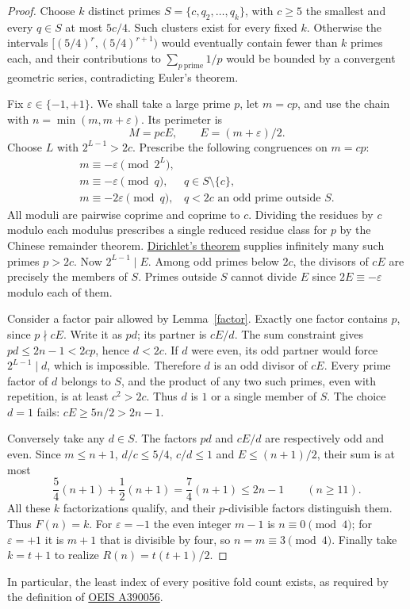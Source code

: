 \documentclass[11pt,letterpaper]{article}
\begin{document}
\begin{proof}
Choose $k$ distinct primes $S=\{c,q_2,\ldots,q_k\}$, with $c\ge5$ the smallest and every $q\in S$ at most $5c/4$. Such clusters exist for every fixed $k$. Otherwise the intervals $[(5/4)^r,(5/4)^{r+1})$ would eventually contain fewer than $k$ primes each, and their contributions to $\sum_{p\ \mathrm{prime}}1/p$ would be bounded by a convergent geometric series, contradicting Euler's theorem.

Fix $\varepsilon\in\{-1,+1\}$. We shall take a large prime $p$, let $m=cp$, and use the chain with $n=\min(m,m+\varepsilon)$. Its perimeter is
\[
 M=pcE,\qquad E=(m+\varepsilon)/2 .
\]
Choose $L$ with $2^{L-1}>2c$. Prescribe the following congruences on $m=cp$:
\[
\begin{array}{ll}
 m\equiv-\varepsilon\pmod{2^L},&\\
 m\equiv-\varepsilon\pmod q, & q\in S\setminus\{c\},\\
 m\equiv-2\varepsilon\pmod q,
   &q<2c\text{ an odd prime outside }S .
\end{array}
\]
All moduli are pairwise coprime and coprime to $c$. Dividing the residues by $c$ modulo each modulus prescribes a single reduced residue class for $p$ by the Chinese remainder theorem. \href{https://math.mit.edu/classes/18.785/2021fa/LectureNotes18.pdf}{Dirichlet's theorem} supplies infinitely many such primes $p>2c$. Now $2^{L-1}\mid E$. Among odd primes below $2c$, the divisors of $cE$ are precisely the members of $S$. Primes outside $S$ cannot divide $E$ since $2E\equiv-\varepsilon$ modulo each of them.

Consider a factor pair allowed by Lemma~\ref{factor}. Exactly one factor contains $p$, since $p\nmid cE$. Write it as $pd$; its partner is $cE/d$. The sum constraint gives $pd\le2n-1<2cp$, hence $d<2c$. If $d$ were even, its odd partner would force $2^{L-1}\mid d$, which is impossible. Therefore $d$ is an odd divisor of $cE$. Every prime factor of $d$ belongs to $S$, and the product of any two such primes, even with repetition, is at least $c^2>2c$. Thus $d$ is $1$ or a single member of $S$. The choice $d=1$ fails: $cE\ge5n/2>2n-1$.

Conversely take any $d\in S$. The factors $pd$ and $cE/d$ are respectively odd and even. Since $m\le n+1$, $d/c\le5/4$, $c/d\le1$ and $E\le(n+1)/2$, their sum is at most
\[
 \frac54(n+1)+\frac12(n+1)=\frac74(n+1)\le2n-1\qquad(n\ge11).
\]
All these $k$ factorizations qualify, and their $p$-divisible factors distinguish them. Thus $F(n)=k$. For $\varepsilon=-1$ the even integer $m-1$ is $n\equiv0\pmod4$; for $\varepsilon=+1$ it is $m+1$ that is divisible by four, so $n=m\equiv3\pmod4$. Finally take $k=t+1$ to realize $R(n)=t(t+1)/2$.
\end{proof}
In particular, the least index of every positive fold count exists, as required by the definition of \href{https://oeis.org/A390056}{OEIS A390056}.
\end{document}
